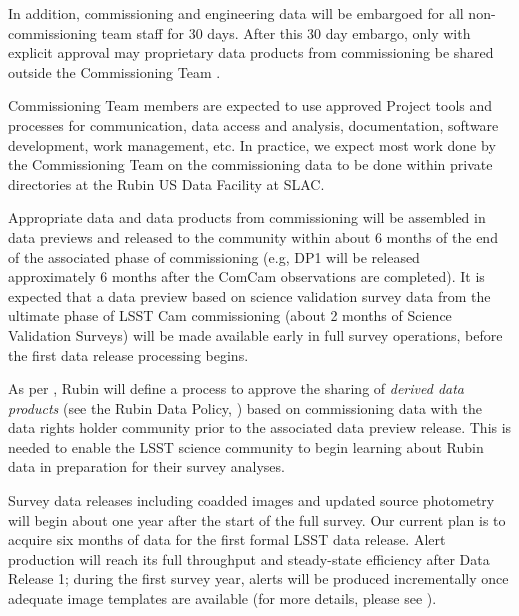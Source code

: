 In addition, commissioning and engineering data will be embargoed for all non-commissioning team staff for 30 days.
After this 30 day embargo, only with explicit approval may proprietary data products from commissioning be shared outside the Commissioning Team   .

Commissioning Team members are expected to use approved Project tools and processes for communication, data access and analysis, documentation, software development, work management, etc.
In practice, we expect most work done by the Commissioning Team on the commissioning data to be done within private directories at the Rubin US Data Facility at SLAC.

Appropriate data and data products from commissioning will be assembled in data previews  and released to the community within about 6 months of the end of the associated phase of commissioning (e.g, DP1 will be released approximately 6 months after the ComCam observations are completed).
It is expected that a data preview based on science validation survey data from the ultimate phase of LSST Cam commissioning (about 2 months of Science Validation Surveys) will be made available early in full survey operations, before the first data release processing begins.

As per , Rubin will define a process to approve the sharing of {\it derived data products} (see the Rubin Data Policy, ) based on commissioning data with the data rights holder community prior to the associated data preview release.
This is needed to enable the LSST science community to begin learning about Rubin data in preparation for their survey analyses.

Survey data releases including coadded images and updated source photometry will begin about one year after the start of the full survey.
Our current plan is to acquire six months of data for the first formal LSST data release.
Alert production will reach its full throughput and steady-state efficiency after Data Release 1; during the first survey year, alerts will be produced incrementally once adequate image templates are available (for more details, please see ).
